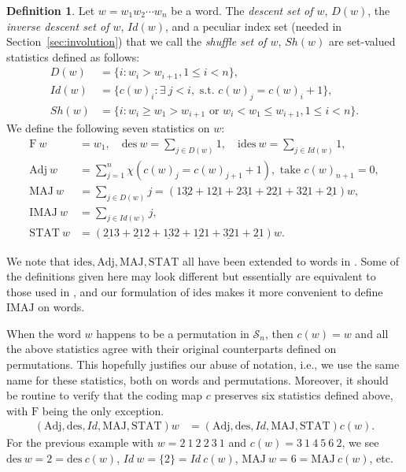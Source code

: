 \documentclass[12pt]{amsart}
\numberwithin{equation}{section}
\theoremstyle{plain}
\theoremstyle{definition}
\newtheorem{Def}[theorem]{Definition}
\def\MAJ{\mathrm{MAJ}}
\def\STAT{\mathrm{STAT}}
\def\F{\mathrm{F}}
\def\IMAJ{\mathrm{IMAJ}}
\def\des{\mathrm{des}}
\def\ides{\mathrm{ides}}
\def\Adj{\mathrm{Adj}}
\def\SS{\mathcal{S}}
\begin{document}
\begin{Def}\label{shuffle}
Let $w=w_1w_2\cdots w_n$ be a word. The \emph{descent set of $w$}, $D(w)$, the \emph{inverse descent set of $w$}, $Id(w)$, and a peculiar index set (needed in Section~\ref{sec:involution}) that we call the \emph{shuffle set of $w$}, $Sh(w)$ are set-valued statistics defined as follows:
\begin{align*}
D(w)&=\{i: w_i>w_{i+1}, 1\leq i<n\},\\
Id(w)&=\{c(w)_i: \exists~j<i, \text{ s.t. } c(w)_j=c(w)_i+1\},\\
Sh(w)&=\{i: w_i\geq w_1>w_{i+1} \text{ or }w_i< w_1\leq w_{i+1}, 1\leq i<n\}.
\end{align*}
We define the following seven statistics on $w$:
\begin{align*}
\F~w &= w_1,\quad \des~w = \sum_{j\in D(w)}1,\quad
\ides~w = \sum_{j\in Id(w)}1,\\
\Adj~w &= \sum_{j=1}^{n}\chi(c(w)_j=c(w)_{j+1}+1), \text{ take }c(w)_{n+1}=0,\\
\MAJ~w &=\sum_{j\in D(w)}j=(1\underline{32}+1\underline{21}+2\underline{31}+2\underline{21}+3\underline{21}+\underline{21})w,\\
\IMAJ~w &= \sum_{j\in Id(w)}j,\\
\STAT~w &= (\underline{21}3+\underline{21}2+\underline{13}2+\underline{12}1+\underline{32}1+\underline{21})w.
\end{align*}
\end{Def}
We note that $\ides, \Adj, \MAJ, \STAT$ all have been extended to words in \cite{KV}. Some of the definitions given here may look different but essentially are equivalent to those used in \cite{KV}, and our formulation of $\ides$ makes it more convenient to define $\IMAJ$ on words.


When the word $w$ happens to be a permutation in $\SS_n$, then $c(w)=w$ and all the above statistics agree with their original counterparts defined on permutations. This hopefully justifies our abuse of notation, i.e., we use the same name for these statistics, both on words and permutations. Moreover, it should be routine to verify that the coding map $c$ preserves six statistics defined above, with $\F$ being the only exception.
\begin{align}\label{6w=6cw}
(\Adj, \des, Id, \MAJ, \STAT)w &=(\Adj, \des, Id, \MAJ, \STAT)c(w).
\end{align}
For the previous example with $w=2~1~2~2~3~1$ and $c(w)=3~1~4~5~6~2$, we see $\des~w=2=\des~c(w)$, $Id~w=\{2\}=Id~c(w)$, $\MAJ~w=6=\MAJ~c(w)$, etc.
\end{document}
